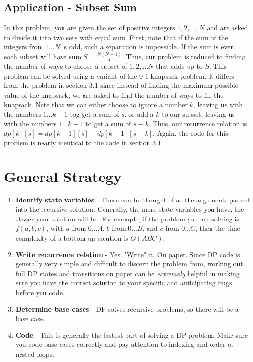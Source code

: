 \documentclass{article}
\newcommand{\nl}[]{\newline}
\begin{document}
\subsection{Application - Subset Sum}
In this problem, you are given the set of positive integers ${1, 2, \ldots, N}$ and are asked to divide it into two sets with equal sum.\nl\nl
First, note that if the sum of the integers from $1\ldots N$ is odd, such a separation is impossible. If the sum is even, each subset will have sum $S=\frac{N(N+1)}{4}$. Thus, our problem is reduced to finding the number of ways to choose a subset of ${1, 2,\ldots N}$ that adds up to $S$.\nl\nl
This problem can be solved using a variant of the 0-1 knapsack problem. It differs from the problem in section 3.1 since instead of finding the maximum possible value of the knapsack, we are asked to find the number of ways to fill the knapsack. Note that we can either choose to ignore a number $k$, leaving us with the numbers $1\ldots k-1$ tog get a sum of $s$, or add a $k$ to our subset, leaving us with the numbers $1\ldots k-1$ to get a sum of $s-k$. Thus, our recurrence relation is $dp[k][s]=dp[k-1][s] + dp[k-1][s-k]$. Again, the code for this problem is nearly identical to the code in section 3.1.
\section{General Strategy}
\begin{enumerate}
    \item \textbf{Identify state variables} - These can be thought of as the arguments passed into the recursive solution. Generally, the more state variables you have, the slower your solution will be. For example, if the problem you are solving is $f(a, b, c)$, with $a$ from $0 \ldots A$, $b$ from $0 \ldots B$, and $c$ from $0 \ldots C$, then the time complexity of a bottom-up solution is $O(ABC)$.
    \item \textbf{Write recurrence relation} - Yes. "Write" it. On paper. Since DP code is generally very simple and difficult to discern the problem from, working out full DP states and transitions on paper can be \emph{extremely} helpful in making sure you have the correct solution to your specific and anticipating bugs before you code.
    \item \textbf{Determine base cases} - DP solves recursive problems, so there will be a base case.
    \item \textbf{Code} - This is generally the fastest part of solving a DP problem. Make sure you code base cases correctly and pay attention to indexing and order of nested loops.
\end{enumerate}
\end{document}
